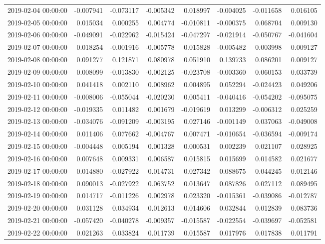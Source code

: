 \begin{tabular}{lrrrrrrr}
2019-02-04 00:00:00 & -0.007941 & -0.073117 & -0.005342 & 0.018997 & -0.004025 & -0.011658 & 0.016105 \\
2019-02-05 00:00:00 & 0.015034 & 0.000255 & 0.004774 & -0.010811 & -0.000375 & 0.068704 & 0.009130 \\
2019-02-06 00:00:00 & -0.049091 & -0.022962 & -0.015424 & -0.047297 & -0.021914 & -0.050767 & -0.041604 \\
2019-02-07 00:00:00 & 0.018254 & -0.001916 & -0.005778 & 0.015828 & -0.005482 & 0.003998 & 0.009127 \\
2019-02-08 00:00:00 & 0.091277 & 0.121871 & 0.080978 & 0.051910 & 0.139733 & 0.086201 & 0.009127 \\
2019-02-09 00:00:00 & 0.008099 & -0.013830 & -0.002125 & -0.023708 & -0.003360 & 0.060153 & 0.033739 \\
2019-02-10 00:00:00 & 0.041418 & 0.002110 & 0.008962 & 0.004895 & 0.052294 & -0.024423 & 0.049206 \\
2019-02-11 00:00:00 & -0.008006 & -0.055044 & -0.020230 & 0.005411 & -0.040416 & -0.054202 & -0.095075 \\
2019-02-12 00:00:00 & -0.019335 & 0.011482 & 0.001679 & -0.019619 & 0.013299 & -0.006312 & 0.025259 \\
2019-02-13 00:00:00 & -0.034076 & -0.091209 & -0.003195 & 0.027146 & -0.001149 & 0.037063 & -0.049008 \\
2019-02-14 00:00:00 & 0.011406 & 0.077662 & -0.004767 & 0.007471 & -0.010654 & -0.036594 & -0.009174 \\
2019-02-15 00:00:00 & -0.004448 & 0.005194 & 0.001328 & 0.000531 & 0.002239 & 0.021107 & 0.028925 \\
2019-02-16 00:00:00 & 0.007648 & 0.009331 & 0.006587 & 0.015815 & 0.015699 & 0.014582 & 0.021677 \\
2019-02-17 00:00:00 & 0.014880 & -0.027922 & 0.014731 & 0.027342 & 0.088675 & 0.044245 & 0.012146 \\
2019-02-18 00:00:00 & 0.090013 & -0.027922 & 0.063752 & 0.013647 & 0.087826 & 0.027112 & 0.089495 \\
2019-02-19 00:00:00 & 0.014717 & -0.011226 & 0.002978 & 0.023320 & -0.015361 & -0.039086 & -0.012787 \\
2019-02-20 00:00:00 & 0.031128 & 0.034934 & 0.012613 & 0.014606 & 0.032844 & 0.012839 & 0.083736 \\
2019-02-21 00:00:00 & -0.057420 & -0.040278 & -0.009357 & -0.015587 & -0.022554 & -0.039697 & -0.052581 \\
2019-02-22 00:00:00 & 0.021263 & 0.033824 & 0.011739 & 0.015587 & 0.017976 & 0.017838 & 0.011791 \\

\end{tabular}
